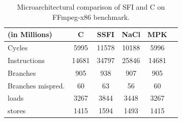 \begin{table}[!htbp]
    \begin{small}
    \begin{center}
  \begin{tabular}{| l | c | c | c | c | c |}
  \hline
  (in Millions)    & C   & SSFI   & NaCl & MPK   \\
  \hline
  \hline
  Cycles           & 5995 & 11578  & 10188 & 5996  \\
  Instructions     & 14681  & 34797  & 25846 & 14681 \\
  Branches         & 905   & 938   & 907  & 905   \\
  Branches mispred.& 60   & 63    & 56   & 60    \\
  loads            & 3267  & 3844  & 3448 & 3267  \\
  stores           & 1415  & 1594   & 1493  & 1415   \\
    \hline
    \end{tabular}
    \end{center}
  \end{small}
  \caption{Microarchitectural comparison of SFI and C on FFmpeg-x86 benchmark.}
  \label{table:micro-ffmpeg-x86}
\end{table}
